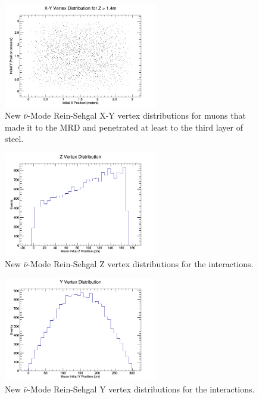 \documentclass[11pt]{article}
\begin{document}
\begin{figure}[H]
\centering
\includegraphics[width=0.6\textwidth]{NewANMReinSehgalImages/1-X-YVertexDistributionANMRS.png}
\caption{New $\bar{\nu}$-Mode Rein-Sehgal X-Y vertex distributions for muons that made it to the MRD and penetrated at least to the third layer of steel.}
\end{figure}

\begin{figure}[H]
\centering
\includegraphics[width=0.6\textwidth]{NewANMReinSehgalImages/2-ZVertexDistributionANMRS.png}
\caption{New $\bar{\nu}$-Mode Rein-Sehgal Z vertex distributions for the interactions.}
\end{figure}

\begin{figure}[H]
\centering
\includegraphics[width=0.6\textwidth]{NewANMReinSehgalImages/3-YVertexDistributionANMRS.png}
\caption{New $\bar{\nu}$-Mode Rein-Sehgal Y vertex distributions for the interactions.}
\end{figure}
\end{document}
